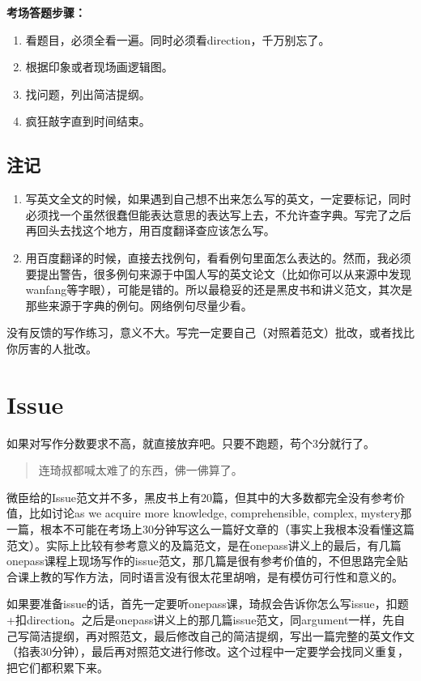 \documentclass[cn,plain]{elegantbookex}
\begin{document}
\textbf{考场答题步骤：}
\begin{enumerate}
    \item 看题目，必须全看一遍。同时必须看direction，千万别忘了。
    \item 根据印象或者现场画逻辑图。
    \item 找问题，列出简洁提纲。
    \item 疯狂敲字直到时间结束。
\end{enumerate}

\subsection{注记}
\begin{enumerate}
    \item 写英文全文的时候，如果遇到自己想不出来怎么写的英文，一定要标记，同时必须找一个虽然很蠢但能表达意思的表达写上去，不允许查字典。写完了之后再回头去找这个地方，用百度翻译查应该怎么写。
    \item 用百度翻译的时候，直接去找例句，看看例句里面怎么表达的。然而，我必须要提出警告，很多例句来源于中国人写的英文论文（比如你可以从来源中发现wanfang等字眼），可能是错的。所以最稳妥的还是黑皮书和讲义范文，其次是那些来源于字典的例句。网络例句尽量少看。
\end{enumerate}

没有反馈的写作练习，意义不大。写完一定要自己（对照着范文）批改，或者找比你厉害的人批改。

\section{Issue}
如果对写作分数要求不高，就直接放弃吧。只要不跑题，苟个3分就行了。

\begin{quote}
连琦叔都喊太难了的东西，佛一佛算了。
\end{quote}

微臣给的Issue范文并不多，黑皮书上有20篇，但其中的大多数都完全没有参考价值，比如讨论as
we acquire more knowledge, comprehensible, complex,
mystery那一篇，根本不可能在考场上30分钟写这么一篇好文章的（事实上我根本没看懂这篇范文）。实际上比较有参考意义的及篇范文，是在onepass讲义上的最后，有几篇onepass课程上现场写作的issue范文，那几篇是很有参考价值的，不但思路完全贴合课上教的写作方法，同时语言没有很太花里胡哨，是有模仿可行性和意义的。

如果要准备issue的话，首先一定要听onepass课，琦叔会告诉你怎么写issue，扣题+扣direction。之后是onepass讲义上的那几篇issue范文，同argument一样，先自己写简洁提纲，再对照范文，最后修改自己的简洁提纲，写出一篇完整的英文作文（掐表30分钟），最后再对照范文进行修改。这个过程中一定要学会找同义重复，把它们都积累下来。
\end{document}
